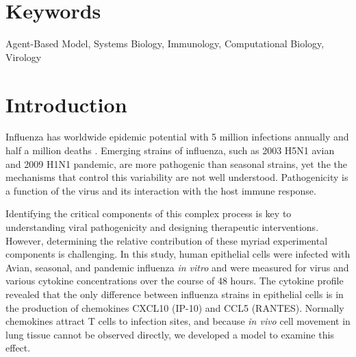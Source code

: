 \documentclass[10pt]{article}
\begin{document}

\section*{Keywords}

Agent-Based Model, Systems Biology, Immunology, Computational Biology, Virology


\section*{Introduction}

Influenza has worldwide epidemic potential with 5 million infections annually and half a million deaths \cite{Who2009}.  Emerging strains of influenza, such as 2003 H5N1 avian and 2009 H1N1 pandemic, are more pathogenic than seasonal strains, yet the the mechanisms that control this variability are not well understood.  Pathogenicity is a function of the virus and its interaction with the host immune response.

{\color{dkblue}Identifying the critical components of this complex process is key to understanding viral pathogenicity and designing therapeutic interventions.  However, determining the relative contribution of these myriad experimental components is challenging.  In this study, human epithelial cells were infected with Avian, seasonal, and pandemic influenza \textit{in vitro} and were measured for virus and various cytokine concentrations over the course of 48 hours.  The cytokine profile revealed that the only difference between influenza strains in epithelial cells is in the production of chemokines CXCL10 (IP-10) and CCL5 (RANTES).  Normally chemokines attract T cells to infection sites, and because \textit{in vivo} cell movement in lung tissue cannot be observed directly, we developed a model to examine this effect.}

\end{document}
